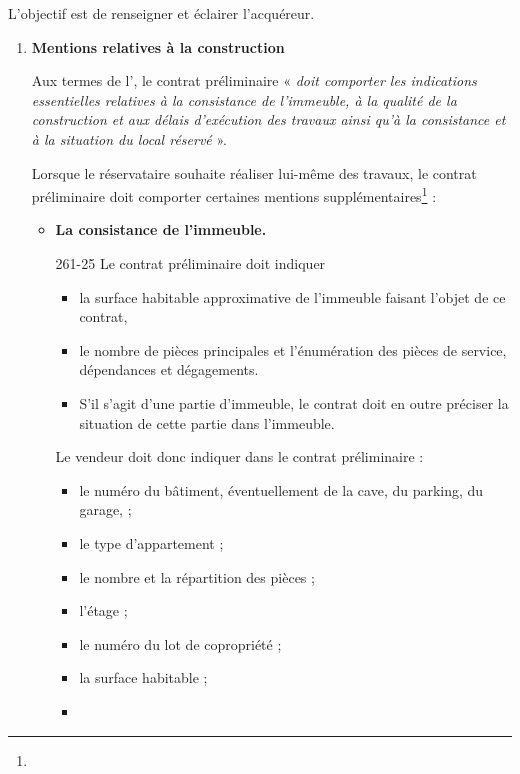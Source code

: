 					L’objectif est de renseigner et éclairer l’acquéreur.
					\bigskip \begin{enumerate}

						\item \textbf{Mentions relatives à la construction}

							Aux termes de l’, le contrat préliminaire « {\itshape doit comporter les indications essentielles relatives à la consistance de l'immeuble, à la qualité de la construction et aux délais d'exécution des travaux ainsi qu'à la consistance et à la situation \lips du local réservé} ».

							Lorsque le réservataire souhaite réaliser lui-même des travaux, le contrat préliminaire doit comporter certaines mentions supplémentaires\footnote{} :

							\begin{itemize}
								\item \textbf{La consistance de l’immeuble.}

								\begin{citationArticle}[R]{261-25}{\cch}
									Le contrat préliminaire doit indiquer
									\begin{itemize}
										\item la surface habitable approximative de l'immeuble faisant l'objet de ce contrat,
										\item le nombre de pièces principales et l'énumération des pièces de service, dépendances et dégagements.
										\item S'il s'agit d'une partie d'immeuble, le contrat doit en outre préciser la situation de cette partie dans l'immeuble.
									\end{itemize}
								\end{citationArticle}

								Le vendeur doit donc indiquer dans le contrat préliminaire :
								\begin{itemize}
									\item le numéro du bâtiment, éventuellement de la cave, du parking, du garage, \etc ;
									\item  le type d’appartement ;
									\item le nombre et la répartition des pièces ;
									\item l’étage ;
									\item le numéro du lot de copropriété ;
									\item la surface habitable ;
									\item  \etc
								\end{itemize}



\end{itemize}
\end{enumerate}
